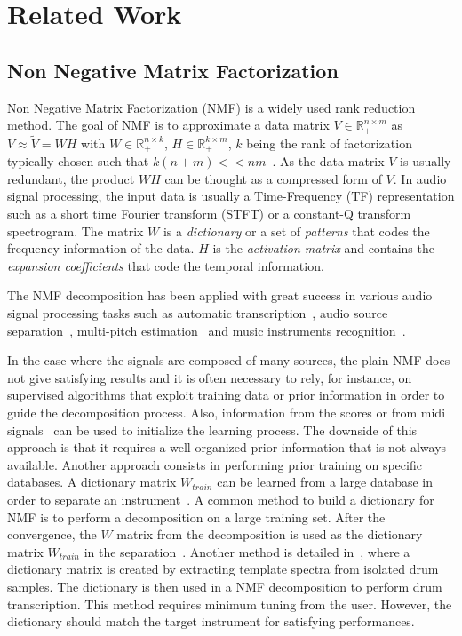 \section{Related Work}
\label{sec:Background}


\subsection{Non Negative Matrix Factorization}


Non Negative Matrix Factorization (NMF) is a widely used rank reduction method. The goal of NMF is to approximate a data matrix $V \in \mathbb{R}_{+}^{n \times m} $ as $V \approx \tilde{V} = WH$ with $W \in \mathbb{R}_{+}^{n \times k}$, $H \in \mathbb{R}_{+}^{k \times m}$, $k$ being the rank of factorization typically chosen such that \mbox{$k(n+m) << nm  $}~\cite{lee99}. As the data matrix $V$ is usually redundant, the product $WH$ can be thought as a compressed form of $V$. In audio signal processing, the input data is usually a Time-Frequency (TF) representation such as a short time Fourier transform (STFT) or a constant-Q transform spectrogram. The matrix $W$ is a {\em dictionary} or a set of {\em patterns} that codes the frequency information of the data. $H$ is the {\em activation matrix} and contains the {\em expansion coefficients} that code the temporal information.

The NMF decomposition has been applied with great success in various audio signal processing tasks such as automatic transcription~\cite{EwertM12,NB:ICASSP-07}, audio source separation~\cite{HennequinDAFx2010,JLD:TASLP10}, multi-pitch estimation~\cite{raczynski2007multipitch} and music instruments recognition~\cite{cichocki2009nonnegative}.

In the case where the signals are composed of many sources, the plain NMF does not give satisfying results and it is often necessary to rely, for instance, on supervised algorithms that exploit training data or prior information in order to guide the decomposition process. Also, information from the scores or from midi signals~\cite{EwertM12} can be used to initialize the learning process. The downside of this approach is that it requires a well organized prior information that is not always available. Another approach consists in performing prior training on specific databases. A dictionary matrix $W_{train}$ can be learned from a large database in order to separate an instrument~\cite{jaureguiberry2011adaptation,wudrum}. A common method to build a dictionary for NMF is to perform a decomposition on a large training set. After the convergence, the $W$ matrix from the decomposition is used as the dictionary matrix $W_{train}$ in the separation~\cite{jaureguiberry2011adaptation}. Another method is detailed in~\cite{wudrum}, where a dictionary matrix is created by extracting template spectra from isolated drum samples. The dictionary is then used in a NMF decomposition to perform drum transcription. This method requires minimum tuning from the user. However, the dictionary should match the target instrument for satisfying performances. 

